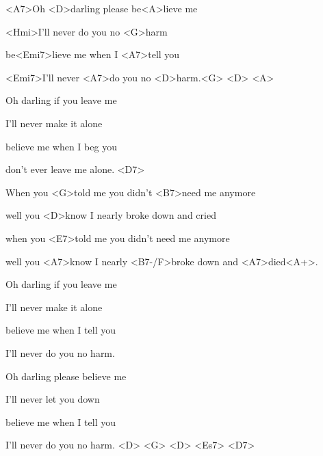 

\zs
<A7>Oh <D>darling please be<A>lieve me 

<Hmi>I'll never do you no <G>harm 

be<Emi7>lieve me when I <A7>tell you 

<Emi7>I'll never <A7>do you no <D>harm.<G> <D> <A> 
\ks

\zs
Oh darling if you leave me 

I'll never make it alone 

believe me when I beg you 

don't ever leave me alone. <D7> 
\ks

\zr
When you <G>told me you didn't <B7>need me anymore 

well you <D>know I nearly broke down and cried 

when you <E7>told me you didn't need me anymore 

well you <A7>know I nearly <B7-/F>broke down and <A7>died<A+>. 
\kr

\zs
Oh darling if you leave me 

I'll never make it alone 

believe me when I tell you 

I'll never do you no harm. 
\ks

\zr
\kr

\zs
Oh darling please believe me 

I'll never let you down 

believe me when I tell you 

I'll never do you no harm. <D> <G> <D> <Es7> <D7>
\ks

\kp
